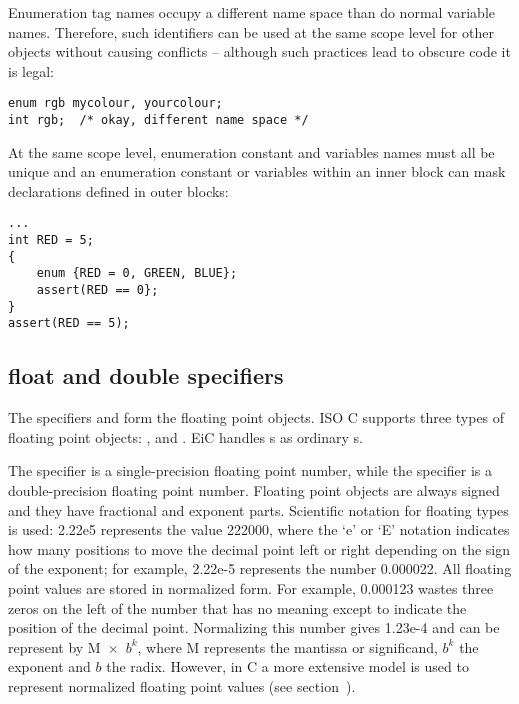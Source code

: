 Enumeration tag names occupy a different name space than do normal
variable names. Therefore, such identifiers can be used at the same
scope level for other objects without causing conflicts -- although
such practices lead to obscure code it is legal:
\begin{production}
\begin{verbatim}
enum rgb mycolour, yourcolour;
int rgb;  /* okay, different name space */
\end{verbatim}
\end{production}

At the same scope level, enumeration constant and variables names must
all be unique and an enumeration constant or variables within an inner
block can mask declarations defined in outer blocks:

\begin{production}
\begin{verbatim}
...
int RED = 5;
{
    enum {RED = 0, GREEN, BLUE};
    assert(RED == 0};
}
assert(RED == 5);
\end{verbatim}
\end{production}


\subsection{float and double specifiers}
\label{sec:float}
The specifiers  and  form the floating point
objects. ISO C supports three types of floating point objects:
,  and . EiC
handles s as ordinary s. 

The  specifier is a single-precision floating point number,
while the
 specifier is a double-precision floating point number. Floating
point objects are always signed and they have fractional and exponent
parts. Scientific notation for floating types is used: 2.22e5
represents the value 222000, where the `e' or `E' notation indicates
how many positions to move the decimal point left or right depending on
the sign of the exponent; for example, 2.22e-5 represents the number
0.000022. All floating point values are stored in normalized form. For
example, 0.000123 wastes three zeros on the left of the number that
has no meaning except to indicate the position of the decimal
point. Normalizing this number gives 1.23e-4 and can be represent by
M~$\times$~$b^k$, where M represents the mantissa or significand,
$b^k$ the exponent and $b$ the radix. However, in C a more
extensive model is used to represent normalized floating point values (see
section~).

